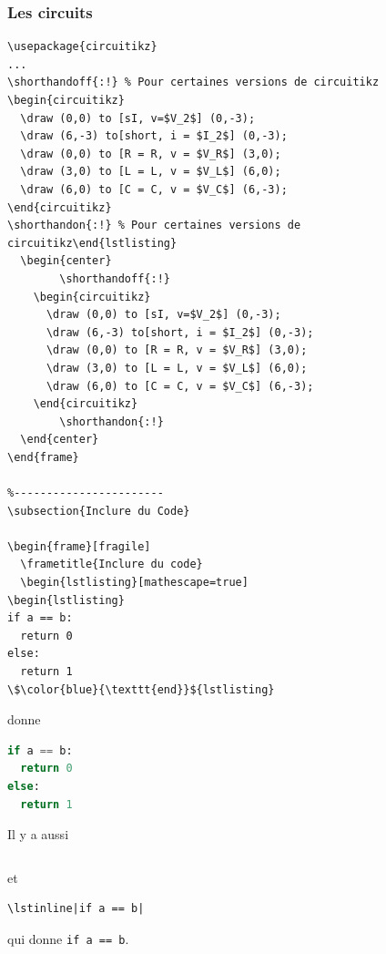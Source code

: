 \begin{frame}[fragile]
  \frametitle{Les circuits}
  \begin{lstlisting}
\usepackage{circuitikz}
...
\shorthandoff{:!} % Pour certaines versions de circuitikz
\begin{circuitikz}
  \draw (0,0) to [sI, v=$V_2$] (0,-3);
  \draw (6,-3) to[short, i = $I_2$] (0,-3);
  \draw (0,0) to [R = R, v = $V_R$] (3,0);
  \draw (3,0) to [L = L, v = $V_L$] (6,0);
  \draw (6,0) to [C = C, v = $V_C$] (6,-3);
\end{circuitikz}
\shorthandon{:!} % Pour certaines versions de circuitikz\end{lstlisting}
  \begin{center}
        \shorthandoff{:!}
    \begin{circuitikz}
      \draw (0,0) to [sI, v=$V_2$] (0,-3);
      \draw (6,-3) to[short, i = $I_2$] (0,-3);
      \draw (0,0) to [R = R, v = $V_R$] (3,0);
      \draw (3,0) to [L = L, v = $V_L$] (6,0);
      \draw (6,0) to [C = C, v = $V_C$] (6,-3);
    \end{circuitikz}
        \shorthandon{:!}
  \end{center}
\end{frame}

\subsection{Inclure du Code}

\begin{frame}[fragile]
  \frametitle{Inclure du code}
  \begin{lstlisting}[mathescape=true]
\begin{lstlisting}
if a == b:
  return 0
else:
  return 1
\$\color{blue}{\texttt{end}}${lstlisting}\end{lstlisting}
donne
  \begin{lstlisting}[language=Python]
if a == b:
  return 0
else:
  return 1\end{lstlisting}

  Il y a aussi
  \begin{lstlisting}
\end{lstlisting}
  et
  \begin{lstlisting}
\lstinline|if a == b|\end{lstlisting}
  qui donne \lstinline|if a == b|.
\end{frame}


